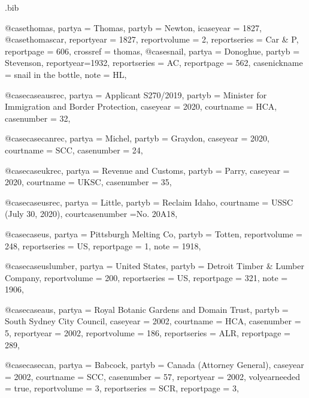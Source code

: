 \begin{filecontents*}[overwrite]{\jobname.bib}


@case{thomas,
  partya = {Thomas},
  partyb = {Newton},
  icaseyear = {1827},
	}
@case{thomascar,
  reportyear = {1827},
  reportvolume = {2},
  reportseries = {Car \& P},
  reportpage = {606},
  crossref = {thomas},
}
@case{snail,
  partya = {Donoghue}, 
  partyb = {Stevenson},
  reportyear={1932},
  reportseries = {AC},
  reportpage = {562},
  casenickname = {snail in the bottle},
  note = {HL},
	}



@case{caseausrec,
  partya = {Applicant S270/2019}, 
  partyb = {Minister for Immigration and Border Protection},
  caseyear = {2020},
  courtname = {HCA},
  casenumber = {32},
	}

@case{casecanrec,
  partya = {Michel}, 
  partyb = {Graydon},
  caseyear = {2020},
  courtname = {SCC},
  casenumber = {24},
	}


@case{caseukrec,
  partya = {Revenue and Customs}, 
  partyb = {Parry},
  caseyear = {2020},
  courtname = {UKSC},
  casenumber = {35},
	}

@case{caseusrec,
  partya = {Little}, 
  partyb = {Reclaim Idaho},
  courtname = {USSC (July 30, 2020)},
  courtcasenumber ={No. 20A18},
	}

@case{caseus,
  partya = {Pittsburgh Melting Co},
  partyb = {Totten},
  reportvolume = {248},
  reportseries = {US},
  reportpage = {1},
  note = {1918},
}

@case{caseuslumber,
  partya = {United States},
  partyb = {Detroit Timber \& Lumber Company},
  reportvolume = {200},
  reportseries = {US},
  reportpage = {321},
  note = {1906},
}

@case{caseaus,
  partya = {Royal Botanic Gardens and Domain Trust}, 
  partyb = {South Sydney City Council},
  caseyear = {2002},
  courtname = {HCA},
  casenumber = {5},
  reportyear = {2002},
  reportvolume = {186},
  reportseries = {ALR},
  reportpage = {289},
	}

@case{casecan,
  partya = {Babcock}, 
  partyb = {Canada (Attorney General)},
  caseyear = {2002},
  courtname = {SCC},
  casenumber = {57},
  reportyear = {2002},
  volyearneeded = {true},
  reportvolume = {3},
  reportseries = {SCR},
  reportpage = {3},
	}



\end{filecontents*}
